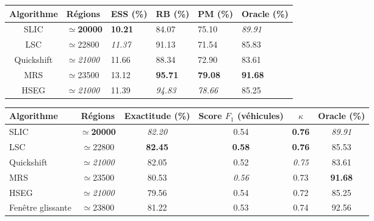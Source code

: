 \begin{table}[ht]
  \centering
  \setlength{\tabcolsep}{10pt}
	\label{table:segmentation_metrics}
  \begin{tabularx}{\textwidth}{ c Y Y Y Y Y }
  \toprule
  Algorithme & Régions & ESS (\%) & RB (\%) & PM (\%) & Oracle (\%)\\
  \midrule
  \gls{SLIC} & $\simeq$\textbf{\num{20000}} & \textbf{\num{10.21}} & \num{84.07} & \num{75.10} & \textit{\num{89.91}}\\
  \gls{LSC} & $\simeq$\num{22800} & \textit{\num{11.37}} & \num{91.13} & \num{71.54} & \num{85.83}\\
  Quickshift & $\simeq$\textit{\num{21000}} & \num{11.66} & \num{88.34} & \num{72.90} & \num{83.61}\\
  \midrule
  \gls{MRS} & $\simeq$\num{23500} & \num{13.12} & \textbf{\num{95.71}} & \textbf{\num{79.08}} & \textbf{\num{91.68}}\\
  \gls{HSEG} & $\simeq$\textit{\num{21000}} & \num{11.39} & \textit{\num{94.83}} & \textit{\num{78.66}} & \num{85.25}\\
  \bottomrule
  \end{tabularx}
\end{table}

\begin{table}[ht]
  \label{table:classification_metrics}
  \begin{tabularx}{\textwidth}{ Y c c c c c }
  \toprule
  Algorithme & Régions & Exactitude (\%) & Score $F_1$ (véhicules) & $\kappa$ & Oracle (\%)\\
	\midrule
  \gls{SLIC} & $\simeq$\textbf{\num{20000}} & \textit{\num{82.20}} & \num{0.54} & \textbf{\num{0.76}} & \textit{\num{89.91}}\\
  \gls{LSC} & $\simeq$\num{22800} & \textbf{\num{82.45}} & \textbf{\num{0.58}} & \textbf{\num{0.76}} & \num{85.53}\\
  Quickshift & $\simeq$\textit{\num{21000}} & \num{82.05} & \num{0.52} & \textit{\num{0.75}} & \num{83.61}\\
  \midrule
  \gls{MRS} & $\simeq$\num{23500} & \num{80.53} & \textit{\num{0.56}} & \num{0.73} & \textbf{\num{91.68}}\\
  \gls{HSEG} & $\simeq$\textit{\num{21000}} & \num{79.56} & \num{0.54} & \num{0.72} & \num{85.25}\\
  \midrule
  Fenêtre glissante & $\simeq$\num{23800} & \num{81.22} & \num{0.53} & \num{0.74} & \num{92.56}\\
  \bottomrule
  \end{tabularx}
\end{table}

